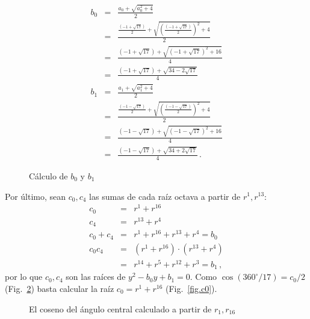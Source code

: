 \begin{figure}[t]
\begin{eqnarray*}
b_0&=&\frac{a_0+\sqrt{a_0^2+4}}{2}\\
&=&\frac{
     \displaystyle\frac{(-1+\sqrt{17})}{2} + 
     \sqrt{\left(\displaystyle\frac{(-1+\sqrt{17})}{2}\right)^2+4}
   }{2}\\
&=&\frac{
     (-1+\sqrt{17}) + 
     \sqrt{\left(-1+\sqrt{17}\right)^2+16}
   }{4}\\
&=&\frac{
     (-1+\sqrt{17}) + 
     \sqrt{34-2\sqrt{17}}
   }{4}\\
b_1&=&\frac{a_1+\sqrt{a_1^2+4}}{2}\\
&=&\frac{
     \displaystyle\frac{(-1-\sqrt{17})}{2} + 
     \sqrt{\left(\displaystyle\frac{(-1-\sqrt{17})}{2}\right)^2+4}
   }{2}\\
&=&\frac{
     (-1-\sqrt{17}) + 
     \sqrt{\left(-1-\sqrt{17}\right)^2+16}
   }{4}\\
&=&\frac{
     (-1-\sqrt{17}) + 
     \sqrt{34+2\sqrt{17}}
   }{4}\,.
\end{eqnarray*}
\caption{Cálculo de $b_0$ y $b_1$}\label{f.b0b1}
\end{figure}

\noindent{}Por último, sean $c_0,c_4$ las sumas de cada raíz octava a partir de $r^1,r^{13}$:
\begin{eqnarray*}
c_0&=&r^1+r^{16}\\
c_4&=&r^{13}+r^4\\
c_0+c_4&=&r^1+r^{16}+r^{13}+r^4=b_0\\
c_0c_4&=&(r^1+r^{16})\cdot(r^{13}+r^4)\\
&=&r^{14}+r^5+r^{12}+r^3=b_1\,,
\end{eqnarray*}
por lo que $c_0,c_4$ son las raíces de $y^2-b_0y+b_1=0$. Como $\cos(360^\circ/17) = c_0/2$ (Fig.~\ref{f.hept-cosine}) basta calcular la raíz $c_0=r^1+r^{16}$ (Fig.~\ref{fig.c0}).

\begin{figure}[b]
\begin{center}
\end{center}
\caption{El coseno del ángulo central calculado a partir de $r_1,r_{16}$}\label{f.hept-cosine}
\end{figure}

